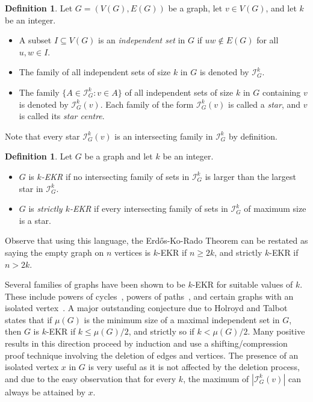 \documentclass[11pt]{article}
\theoremstyle{definition}
\newtheorem{definition}[theorem]{Definition}
\newcommand{\cI}{\mathcal{I}}
\begin{document}
\begin{definition}
Let $G=(V(G), E(G))$ be a graph, let $v\in V(G)$, and let $k$ be an integer.  
\begin{itemize}
    \item A subset $I \subseteq V(G)$ is an \emph{independent set} in $G$ if $uw \notin E(G)$ for all $u, w \in I$. 
    \item The family of all independent sets of size $k$ in $G$ is denoted by $\mathcal{I}_{G}^{k}$.
    \item The family $\{A\in\mathcal{I}_{G}^{k}:v\in A\}$ of all independent sets of size $k$ in $G$ containing $v$ is denoted by $\mathcal{I}_{G}^{k}(v)$. Each family of the form $\cI_G^k(v)$ is called a \emph{star}, and $v$ is called its \emph{star centre}.
\end{itemize}
\end{definition}
Note that every star $\cI^k_G(v)$ is an intersecting family in $\cI^k_G$ by definition.

\begin{definition}
Let $G$ be a graph and let $k$ be an integer.
\begin{itemize}
    \item $G$ is \textit{$k$-EKR} if no intersecting family of sets in $\cI_G^k$ is larger than the largest star in $\cI_G^k$.
    \item $G$ is \textit{strictly $k$-EKR} if every intersecting family of sets in $\cI_G^k$ of maximum size is a star. 
\end{itemize}
\end{definition}
Observe that using this language, the Erd\H os-Ko-Rado Theorem can be restated as saying the empty graph on $n$ vertices is $k$-EKR if $n\geq 2k$, and strictly $k$-EKR if $n>2k$. 

Several families of graphs have been shown to be $k$-EKR for suitable values of $k$. These include powers of cycles~\cite{T}, powers of paths~\cite{HST}, and certain graphs with an isolated vertex~\cite{BH,HST,HK}. A major outstanding conjecture due to Holroyd and Talbot~\cite{HT} states that if $\mu(G)$ is the minimum size of a maximal independent set in $G$, then $G$ is $k$-EKR if $k\leq\mu(G)/2$, and strictly so if $k<\mu(G)/2$. Many positive results in this direction proceed by induction and use a shifting/compression proof technique involving the deletion of edges and vertices. The presence of an isolated vertex $x$ in $G$ is very useful as it is not affected by the deletion process, and due to the easy observation that for every $k$, the maximum of $|\cI_G^k(v)|$ can always be attained by $x$.
\end{document}
